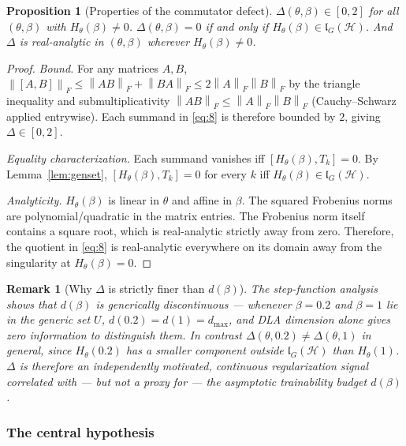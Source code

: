 \documentclass[pdflatex,sn-mathphys-num]{sn-jnl}
\theoremstyle{thmstyleone}
\newtheorem{proposition}[theorem]{Proposition}
\theoremstyle{thmstyletwo}
\newtheorem{remark}{Remark}
\theoremstyle{thmstylethree}
\newcommand{\Hil}{\mathcal{H}}
\newcommand{\lG}{\mathfrak{l}_G(\Hil)}
\newcommand{\fronorm}[1]{\left\lVert #1 \right\rVert_{F}}
\begin{document}
\begin{proposition}[Properties of the commutator defect]
\label{prop:defect}
$\Delta(\theta,\beta) \in [0,2]$ for all $(\theta,\beta)$ with $H_\theta(\beta) \neq 0$.  $\Delta(\theta,\beta) = 0$ if and only if $H_\theta(\beta) \in \lG$. And $\Delta$ is real-analytic in $(\theta,\beta)$ wherever $H_\theta(\beta) \neq 0$.
\end{proposition}
\begin{proof}
\textit{Bound.} For any matrices $A,B$, $\fronorm{[A,B]} \le \fronorm{AB} + \fronorm{BA} \le 2\fronorm{A}\fronorm{B}$ by the triangle inequality and submultiplicativity $\fronorm{AB} \le \fronorm{A}\fronorm{B}$ (Cauchy--Schwarz applied entrywise). Each summand in \eqref{eq:8} is therefore bounded by $2$, giving $\Delta \in [0,2]$.

\textit{Equality characterization.} Each summand vanishes iff $[H_\theta(\beta), T_k] = 0$. By Lemma~\ref{lem:genset}, $[H_\theta(\beta), T_k] = 0$ for every $k$ iff $H_\theta(\beta) \in \lG$.

\textit{Analyticity.} $H_\theta(\beta)$ is linear in $\theta$ and affine in $\beta$. The squared Frobenius norms are polynomial/quadratic in the matrix entries. The Frobenius norm itself contains a square root, which is real-analytic strictly away from zero. Therefore, the quotient in \eqref{eq:8} is real-analytic everywhere on its domain away from the singularity at $H_\theta(\beta) = 0$.
\end{proof}

\begin{remark}[Why $\Delta$ is strictly finer than $d(\beta)$]
\label{rem:finer}
The step-function analysis shows that $d(\beta)$ is generically discontinuous --- whenever $\beta=0.2$ and $\beta=1$ lie in the generic set $U$, $d(0.2) = d(1) = d_{\max}$, and DLA dimension alone gives zero information to distinguish them. In contrast $\Delta(\theta,0.2) \neq \Delta(\theta,1)$ in general, since $H_\theta(0.2)$ has a smaller component outside $\lG$ than $H_\theta(1)$. $\Delta$ is therefore an independently motivated, continuous regularization signal correlated with — but not a proxy for — the asymptotic trainability budget $d(\beta)$.
\end{remark}

\subsubsection{The central hypothesis}
\label{sec:hypothesis}
\end{document}
